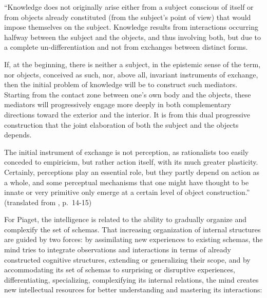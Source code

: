 \documentclass[runningheads]{llncs}
\begin{document}
\begin{adjustwidth}{1cm}{1cm}
``Knowledge does not originally arise either from a subject conscious of itself or from objects already constituted (from the subject's point of view) that would impose themselves on the subject. 
Knowledge results from interactions occurring halfway between the subject and the objects, and thus involving both, but due to a complete un-differentiation and not from exchanges between distinct forms.

If, at the beginning, there is neither a subject, in the epistemic sense of the term, nor objects, conceived as such, nor, above all, invariant instruments of exchange, then the initial problem of knowledge will be to construct such mediators. 
Starting from the contact zone between one's own body and the objects, these mediators will progressively engage more deeply in both complementary directions toward the exterior and the interior. 
It is from this dual progressive construction that the joint elaboration of both the subject and the objects depends.

The initial instrument of exchange is not perception, as rationalists too easily conceded to empiricism, but rather action itself, with its much greater plasticity. 
Certainly, perceptions play an essential role, but they partly depend on action as a whole, and some perceptual mechanisms that one might have thought to be innate or very primitive only emerge at a certain level of object construction.'' (translated from \cite{piaget_lepistemologie_2011}, p.~14-15)
\\

\end{adjustwidth}

For Piaget, the intelligence is related to the ability to gradually organize and complexify the set of schemas. 
That increasing organization of internal structures are guided by two forces: 
by assimilating new experiences to existing schemas, the mind tries to integrate observations and interactions in terms of already constructed cognitive structures, extending or generalizing their scope, and
by accommodating its set of schemas to surprising or disruptive experiences, differentiating, specializing, complexifying its internal relations, the mind creates new intellectual resources for better understanding and mastering its interactions: 
\\
\end{document}
